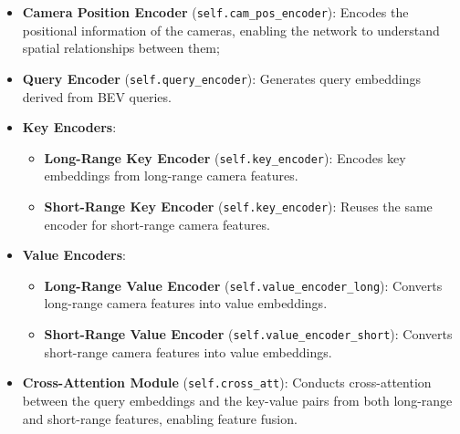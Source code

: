 \begin{itemize}
    \item \textbf{Camera Position Encoder} (\texttt{self.cam\_pos\_encoder}): Encodes the positional information of the cameras, enabling the network to understand spatial relationships between them;
    \item \textbf{Query Encoder} (\texttt{self.query\_encoder}): Generates query embeddings derived from BEV queries.
    \item \textbf{Key Encoders}:
    \begin{itemize}
        \item \textbf{Long-Range Key Encoder} (\texttt{self.key\_encoder}): Encodes key embeddings from long-range camera features.
        \item \textbf{Short-Range Key Encoder} (\texttt{self.key\_encoder}): Reuses the same encoder for short-range camera features.
    \end{itemize}
    \item \textbf{Value Encoders}:
    \begin{itemize}
        \item \textbf{Long-Range Value Encoder} (\texttt{self.value\_encoder\_long}): Converts long-range camera features into value embeddings.
        \item \textbf{Short-Range Value Encoder} (\texttt{self.value\_encoder\_short}): Converts short-range camera features into value embeddings.
    \end{itemize}
    \item \textbf{Cross-Attention Module} (\texttt{self.cross\_att}): Conducts cross-attention between the query embeddings and the key-value pairs from both long-range and short-range features, enabling feature fusion.
\end{itemize}

